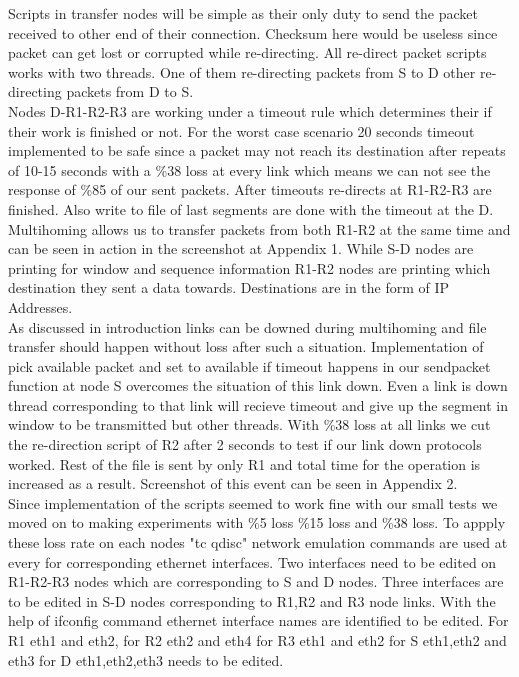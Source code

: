 \documentclass[conference]{IEEEtran}
\begin{document}
Scripts in transfer nodes will be simple as their only duty to send the packet received to other end of their connection. Checksum here would be useless since packet can get lost or corrupted while re-directing. All re-direct packet scripts works with two threads. One of them re-directing packets from S to D other re-directing packets from D to S.\\

Nodes D-R1-R2-R3 are working under a timeout rule which determines their if their work is finished or not. For the worst case scenario 20 seconds timeout implemented to be safe since a packet may not reach its destination after repeats of 10-15 seconds with a \%38 loss at every link which means we can not see the response of \%85 of our sent packets. After timeouts re-directs at R1-R2-R3 are finished. Also write to file of last segments are done with the timeout at the D.\\

Multihoming allows us to transfer packets from both R1-R2 at the same time and can be seen in action in the screenshot at Appendix 1. While S-D nodes are printing for window and sequence information R1-R2 nodes are printing which destination they sent a data towards. Destinations are in the form of IP Addresses.\\

As discussed in introduction links can be downed during multihoming and file transfer should happen without loss after such a situation. Implementation of pick available packet and set to available if timeout happens in our sendpacket function at node S overcomes the situation of this link down. Even a link is down thread corresponding to that link will recieve timeout and give up the segment in window to be transmitted but other threads. With \%38 loss at all links we cut the re-direction script of R2 after 2 seconds to test if our link down protocols worked. Rest of the file is sent by only R1 and total time for the operation is increased as a result. Screenshot of this event can be seen in Appendix 2.\\

Since implementation of the scripts seemed to work fine with our small tests we moved on to making experiments with \%5 loss \%15 loss and \%38 loss. To appply these loss rate on each nodes "tc qdisc" network emulation commands are used at every for corresponding ethernet interfaces. Two interfaces need to be edited on R1-R2-R3 nodes which are corresponding to S and D nodes. Three interfaces are to be edited in S-D nodes corresponding to R1,R2 and R3 node links. With the help of ifconfig command ethernet interface names are identified to be edited. For R1 eth1 and eth2, for R2 eth2 and eth4 for R3 eth1 and eth2 for S eth1,eth2 and eth3 for D eth1,eth2,eth3 needs to be edited. \\
\end{document}
